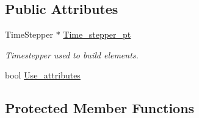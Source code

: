 \subsection*{Public Attributes}
\begin{DoxyCompactItemize}
\item 
Time\+Stepper $\ast$ \hyperlink{classoomph_1_1TriangleMesh_a0478e2d31a2787eb4536bb61aa4bbbfd}{Time\+\_\+stepper\+\_\+pt}
\begin{DoxyCompactList}\small\item\em Timestepper used to build elements. \end{DoxyCompactList}\item 
bool \hyperlink{classoomph_1_1TriangleMesh_a166a8057de8390280acb6365c3df87d0}{Use\+\_\+attributes}
\end{DoxyCompactItemize}
\subsection*{Protected Member Functions}
